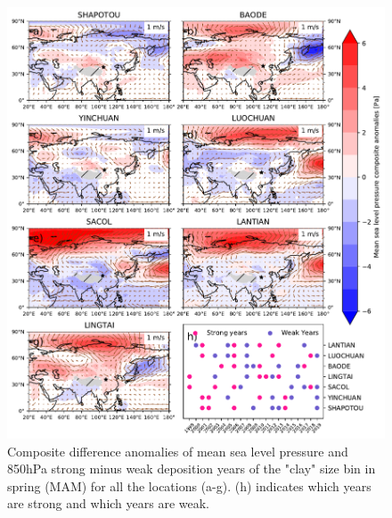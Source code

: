 \begin{figure}[htbp]
    \centering
    \includegraphics[width=\textwidth]{texfiles/figs/mslp_850hPa_2micron_MAM.pdf}
    \caption{Composite difference anomalies of mean sea level pressure and 850hPa strong minus weak deposition years of the "clay" size bin in spring (MAM) for all the locations (a-g).  (h) indicates which years are strong and which years are weak.}
    \label{fig:MAM_850_fine_composite}
\end{figure}

